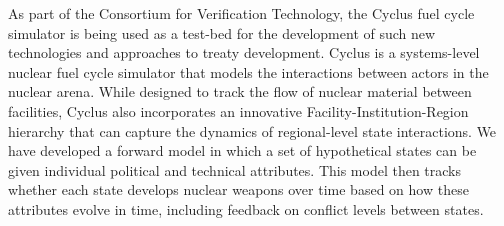 As part of the Consortium for Verification Technology, the Cyclus fuel cycle simulator is being used as a test-bed for the development of such new technologies and approaches to treaty development. Cyclus is a systems-level nuclear fuel cycle simulator that models the interactions between actors in the nuclear arena. While designed to track the flow of nuclear material between facilities, Cyclus also incorporates an innovative Facility-Institution-Region hierarchy that can capture the dynamics of regional-level state interactions.  We have developed a forward model in which a set of hypothetical states can be given individual political and technical attributes. This model then tracks whether each state develops nuclear weapons over time based on how these attributes evolve in time, including feedback on conflict levels between states.

